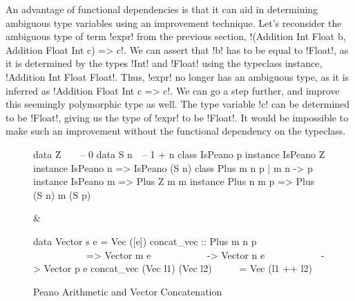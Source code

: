 \documentclass[format=acmsmall,manuscript,screen,nonacm,margin=1in,11pt]{acmart}
\begin{document}
An advantage of functional dependencies is that it can aid in determining
ambiguous type variables using an improvement technique.
Let's reconsider the ambiguous type of term !expr!
from the previous section, !(Addition Int Float b, Addition Float Int c) => c!. We can assert that !b!
has to be equal to !Float!, as it is determined by the types !Int! and !Float! using
the typeclass instance, !Addition Int Float Float!.
Thus, !expr! no longer has an ambiguous type, as it is inferred as !Addition Float Int c => c!.
We can go a step further, and improve this seemingly polymorphic type as well.
The type variable !c! can be determined to be !Float!, giving us the type of
!expr! to be !Float!. It would be impossible to make such
an improvement without the functional dependency on the typeclass.
\begin{figure}[ht]
  \footnotesize
  \begin{tabularx}\textwidth{X X}
\begin{code}^^J
data Z\ \ \ \ -- 0^^J
data S n\ \ -- 1 + n^^J
^^J
class IsPeano p^^J
instance IsPeano Z^^J
instance IsPeano n => IsPeano (S n)^^J
^^J
class Plus m n p | m n -> p^^J
instance IsPeano m => Plus Z m m^^J
instance Plus n m p => Plus (S n) m (S p)^^J
\end{code}&
\begin{code}^^J
data Vector s e = Vec ([e])^^J
^^J
concat_vec :: Plus m n p^^J
\ \ \ \ \ \ \ \ \ \ \ => Vector m e^^J
\ \ \ \ \ \ \ \ \ \ \ -> Vector n e^^J
\ \ \ \ \ \ \ \ \ \ \ -> Vector p e^^J
concat_vec (Vec l1) (Vec l2)^^J
\ \ \ \ \  = Vec (l1 ++ l2)^^J
\end{code}
  \end{tabularx}
  \caption{Peano Arithmetic and Vector Concatenation}
  \label{fig:peano-arith-tcfd}
\end{figure}
\end{document}
